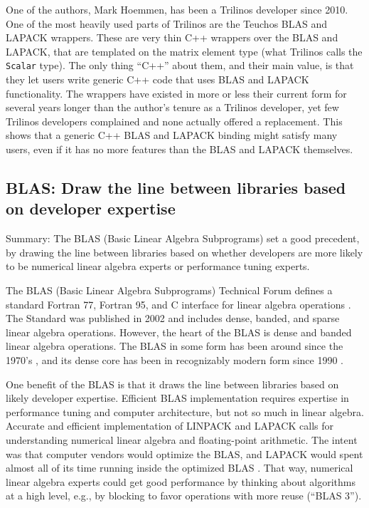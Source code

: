 One of the authors, Mark Hoemmen, has been a Trilinos
\cite{heroux2005trilinos} developer since 2010.  One of the most
heavily used parts of Trilinos are the Teuchos BLAS and LAPACK
wrappers.  These are very thin C++ wrappers over the BLAS and LAPACK,
that are templated on the matrix element type (what Trilinos calls the
\texttt{Scalar} type).  The only thing ``C++'' about them, and their
main value, is that they let users write generic C++ code that uses
BLAS and LAPACK functionality.  The wrappers have existed in more or
less their current form for several years longer than the author's
tenure as a Trilinos developer, yet few Trilinos developers complained
and none actually offered a replacement.  This shows that a generic
C++ BLAS and LAPACK binding might satisfy many users, even if it has
no more features than the BLAS and LAPACK themselves.

\subsection{BLAS: Draw the line between libraries
  based on developer expertise}
\label{SS:other-langs:BLAS}

Summary: The BLAS (Basic Linear Algebra Subprograms) set a good
precedent, by drawing the line between libraries based on whether
developers are more likely to be numerical linear algebra experts or
performance tuning experts.

The BLAS (Basic Linear Algebra Subprograms) Technical Forum defines a
standard Fortran 77, Fortran 95, and C interface for linear algebra
operations \cite{BLAS-standard}.  The Standard was published in 2002
and includes dense, banded, and sparse linear algebra operations.
However, the heart of the BLAS is dense and banded linear algebra
operations.  The BLAS in some form has been around since the 1970's
\cite{lawson1979blas,dongarra2005history}, and its dense core has been
in recognizably modern form since 1990 \cite{dongarra1990blas3}.

One benefit of the BLAS is that it draws the line between libraries
based on likely developer expertise.  Efficient BLAS implementation
requires expertise in performance tuning and computer architecture,
but not so much in linear algebra.  Accurate and efficient
implementation of LINPACK and LAPACK calls for understanding numerical
linear algebra and floating-point arithmetic.  The intent was that
computer vendors would optimize the BLAS, and LAPACK would spent
almost all of its time running inside the optimized BLAS \cite[``The
BLAS as the Key to Portability'']{LAPACK-Users-Guide}.  That way,
numerical linear algebra experts could get good performance by
thinking about algorithms at a high level, e.g., by blocking to favor 
operations with more reuse (``BLAS 3'').

